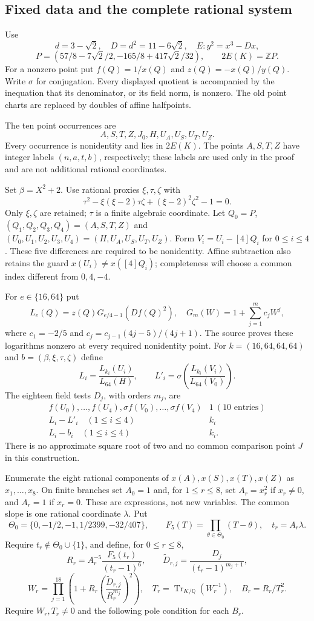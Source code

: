 \documentclass[11pt]{article}
\theoremstyle{definition}
\begin{document}
\subsection{Fixed data and the complete rational system}
Use
\[
 d=3-\sqrt2,\quad D=d^2=11-6\sqrt2,\quad
 E:y^2=x^3-Dx,
\]
\[
 P=(57/8-7\sqrt2/2,-165/8+417\sqrt2/32),\qquad
 2E(K)=\mathbb ZP.
\]
For a nonzero point put $f(Q)=1/x(Q)$ and $z(Q)=-x(Q)/y(Q)$.
Write $\sigma$ for conjugation. Every displayed quotient is accompanied
by the inequation that its denominator, or its field norm, is nonzero.
The old point charts are replaced by doubles of affine halfpoints.

The ten point occurrences are
\[
 A,S,T,Z,J_0,H,U_A,U_S,U_T,U_Z.
\]
Every occurrence is nonidentity and lies in $2E(K)$. The points $A,S,T,Z$
have integer labels $(n,a,t,b)$, respectively; these labels are used only
in the proof and are not additional rational coordinates.

Set $\beta=X^2+2$. Use rational proxies $\xi,\tau,\zeta$ with
\[
 \tau^2-\xi(\xi-2)\tau\zeta+(\xi-2)^2\zeta^2-1=0.
\]
Only $\xi,\zeta$ are retained; $\tau$ is a finite algebraic coordinate.
Let $Q_0=P$, $(Q_1,Q_2,Q_3,Q_4)=(A,S,T,Z)$ and
$(U_0,U_1,U_2,U_3,U_4)=(H,U_A,U_S,U_T,U_Z)$.
Form $V_i=U_i-[4]Q_i$ for $0\le i\le4$. These five differences are
required to be nonidentity. Affine subtraction also retains the guard
$x(U_i)\ne x([4]Q_i)$; completeness will choose a common index different
from $0,4,-4$.

For $e\in\{16,64\}$ put
\[
 L_e(Q)=z(Q)G_{e/4-1}(Df(Q)^2),\quad
 G_m(W)=1+\sum_{j=1}^m c_jW^j,
\]
where $c_1=-2/5$ and $c_j=c_{j-1}(4j-5)/(4j+1)$.
The source proves these logarithms nonzero at every required nonidentity
point. For $k=(16,64,64,64)$ and $b=(\beta,\xi,\tau,\zeta)$ define
\[
 L_i=\frac{L_{k_i}(U_i)}{L_{64}(H)},\qquad
 L'_i=\sigma\!\left(\frac{L_{k_i}(V_i)}{L_{64}(V_0)}\right).
\]
The eighteen field tests $D_j$, with orders $m_j$, are
\[
 \begin{array}{c|c}
 f(U_0),\ldots,f(U_4),\sigma f(V_0),\ldots,\sigma f(V_4)&1\ (10\text{ entries})\\
 L_i-L'_i\quad(1\le i\le4)& k_i\\
 L_i-b_i\quad(1\le i\le4)&k_i.
 \end{array}
\]
There is no approximate square root of two and no common comparison
point $J$ in this construction.

Enumerate the eight rational components of $x(A),x(S),x(T),x(Z)$ as
$x_1,\ldots,x_8$. On finite branches set $A_0=1$ and, for $1\le r\le8$,
set $A_r=x_r^2$ if $x_r\ne0$, and $A_r=1$ if $x_r=0$. These are
expressions, not new variables. The common slope is one rational
coordinate $\lambda$. Put
\[
 \Theta_0=\{0,-1/2,-1,1/2399,-32/407\},\qquad
 F_5(T)=\prod_{\theta\in\Theta_0}(T-\theta),\quad t_r=A_r\lambda.
\]
Require $t_r\notin\Theta_0\cup\{1\}$, and define, for $0\le r\le8$,
\[
 R_r=A_r^{-5}\frac{F_5(t_r)}{(t_r-1)^6},\qquad
 \widetilde D_{r,j}=\frac{D_j}{(t_r-1)^{m_j+1}},
\]
\[
 W_r=\prod_{j=1}^{18}\left(1+R_r
       \left(\frac{\widetilde D_{r,j}}{R_r^{m_j}}\right)^2\right),
 \quad T_r=\operatorname{Tr}_{K/\mathbb Q}(W_r^{-1}),
 \quad B_r=R_r/T_r^2.
\]
Require $W_r,T_r\ne0$ and the following pole condition for each $B_r$.
\end{document}
